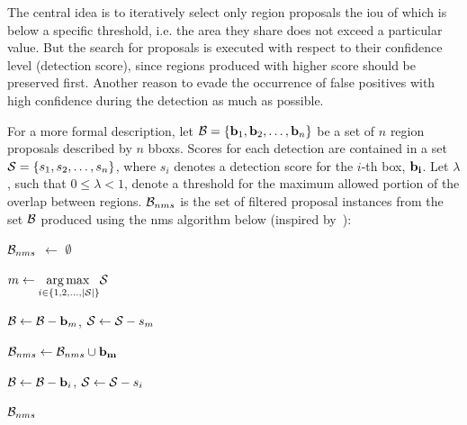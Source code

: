 The central idea is to iteratively select only region proposals the \gls{iou} of which is below a specific threshold, i.e. the area they share does not exceed a particular value. But the search for proposals is executed with respect to their confidence level (detection score), since regions produced with higher score should be preserved first. Another reason to evade the occurrence of false positives with high confidence during the detection as much as possible.

For a more formal description, let $\mathcal{B} = \left\{ {\mathbf{b}_1, \mathbf{b}_2, \dots, \mathbf{b}_n} \right\}$ be a set of $n$ region proposals described by $n$ \glspl{bbox}. Scores for each detection are contained in a set $\mathcal{S} = \left\{ {s_1, s_2, \dots, s_n} \right\}$, where $s_i$ denotes a detection score for the $i$-th box, $\mathbf{b_i}$. Let $\lambda$, such that $0 \leq \lambda < 1$, denote a threshold for the maximum allowed portion of the overlap between regions. $\mathcal{B}_{nms}$ is the set of filtered proposal instances from the set $\mathcal{B}$ produced using the \gls{nms} algorithm below (inspired by~\cite{Bodla2017}):

\begin{algorithmic}[1]
    
        \State $\mathcal{B}_{nms}$ $\gets$ $\emptyset$
        
            
            \State $m \gets \underset{i \in \left\{ {1, 2, \dots, \left\vert \mathcal{S} \right\vert} \right\}}{\operatorname*{arg\,max}{}} \mathcal{S}$
            
            \State $\mathcal{B} \gets \mathcal{B} - \mathbf{b}_m$, $\mathcal{S} \gets \mathcal{S} - s_m$
            
            \State $\mathcal{B}_{nms} \gets \mathcal{B}_{nms} \cup \mathbf{b_m}$
            
            
                
                    \State $\mathcal{B} \gets \mathcal{B} - \mathbf{b}_i$, $\mathcal{S} \gets \mathcal{S} - s_i$
                \EndIf
            \EndFor
        \EndWhile
        
        \State \Return $\mathcal{B}_{nms}$
    \EndFunction
\end{algorithmic}

